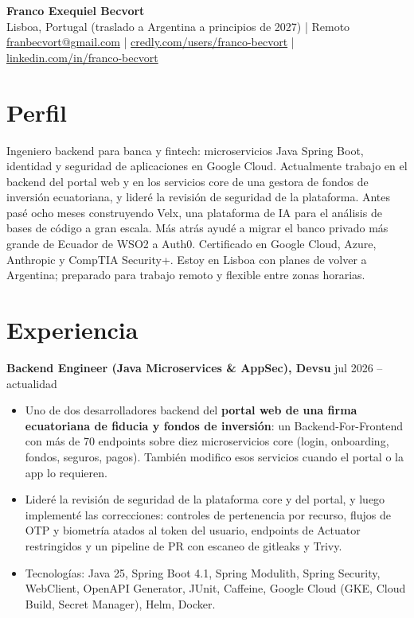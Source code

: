 \documentclass[10pt, a4paper]{article}
\begin{document}
\begin{center}
    {\LARGE\bfseries Franco Exequiel Becvort} \\
    Lisboa, Portugal (traslado a Argentina a principios de 2027) | Remoto \\
    \href{mailto:franbecvort@gmail.com}{franbecvort@gmail.com} |
    \href{https://credly.com/users/franco-becvort}{credly.com/users/franco-becvort} |
    \href{https://linkedin.com/in/franco-becvort}{linkedin.com/in/franco-becvort} \\
\end{center}

\vspace{5pt}

\section{Perfil}
Ingeniero backend para banca y fintech: microservicios Java Spring Boot, identidad y seguridad de aplicaciones en Google Cloud. Actualmente trabajo en el backend del portal web y en los servicios core de una gestora de fondos de inversión ecuatoriana, y lideré la revisión de seguridad de la plataforma. Antes pasé ocho meses construyendo Velx, una plataforma de IA para el análisis de bases de código a gran escala. Más atrás ayudé a migrar el banco privado más grande de Ecuador de WSO2 a Auth0. Certificado en Google Cloud, Azure, Anthropic y CompTIA Security+. Estoy en Lisboa con planes de volver a Argentina; preparado para trabajo remoto y flexible entre zonas horarias.

\section{Experiencia}
\textbf{Backend Engineer (Java Microservices \& AppSec), Devsu} \hfill jul 2026 -- actualidad
\begin{itemize}[leftmargin=10pt, noitemsep]
    \item Uno de dos desarrolladores backend del \textbf{portal web de una firma ecuatoriana de fiducia y fondos de inversión}: un Backend-For-Frontend con más de 70 endpoints sobre diez microservicios core (login, onboarding, fondos, seguros, pagos). También modifico esos servicios cuando el portal o la app lo requieren.
    \item Lideré la revisión de seguridad de la plataforma core y del portal, y luego implementé las correcciones: controles de pertenencia por recurso, flujos de OTP y biometría atados al token del usuario, endpoints de Actuator restringidos y un pipeline de PR con escaneo de gitleaks y Trivy.
    \item Tecnologías: Java 25, Spring Boot 4.1, Spring Modulith, Spring Security, WebClient, OpenAPI Generator, JUnit, Caffeine, Google Cloud (GKE, Cloud Build, Secret Manager), Helm, Docker.
\end{itemize}
\end{document}
